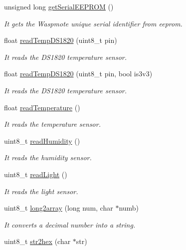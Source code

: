 \begin{DoxyCompactItemize}
unsigned long \hyperlink{class_wasp_utils_a3e994a7e847548f7fbaf1f5477146ad6}{get\+Serial\+E\+E\+P\+R\+OM} ()
\begin{DoxyCompactList}\small\item\em It gets the Waspmote unique serial identifier from eeprom. \end{DoxyCompactList}\item 
float \hyperlink{class_wasp_utils_acc9d1a13370145d1da32695940f0180b}{read\+Temp\+D\+S1820} (uint8\+\_\+t pin)
\begin{DoxyCompactList}\small\item\em It reads the D\+S1820 temperature sensor. \end{DoxyCompactList}\item 
float \hyperlink{class_wasp_utils_a6cef8fdccf628cab13da76257b6b4d5e}{read\+Temp\+D\+S1820} (uint8\+\_\+t pin, bool is3v3)
\begin{DoxyCompactList}\small\item\em It reads the D\+S1820 temperature sensor. \end{DoxyCompactList}\item 
float \hyperlink{class_wasp_utils_a69c215bccec69bb4d5de675098e9b88f}{read\+Temperature} ()
\begin{DoxyCompactList}\small\item\em It reads the temperature sensor. \end{DoxyCompactList}\item 
uint8\+\_\+t \hyperlink{class_wasp_utils_a2e0fe62aadf41cf1c0f217baa56c4822}{read\+Humidity} ()
\begin{DoxyCompactList}\small\item\em It reads the humidity sensor. \end{DoxyCompactList}\item 
uint8\+\_\+t \hyperlink{class_wasp_utils_a70071fbfb5a163525888aa38e8fac376}{read\+Light} ()
\begin{DoxyCompactList}\small\item\em It reads the light sensor. \end{DoxyCompactList}\item 
uint8\+\_\+t \hyperlink{class_wasp_utils_a55712047cc469db5b593ae2ceda7183b}{long2array} (long num, char $\ast$numb)
\begin{DoxyCompactList}\small\item\em It converts a decimal number into a string. \end{DoxyCompactList}\item 
uint8\+\_\+t \hyperlink{class_wasp_utils_ab0d858d85ec9374e312328fee586fb8b}{str2hex} (char $\ast$str)

\end{DoxyCompactItemize}
